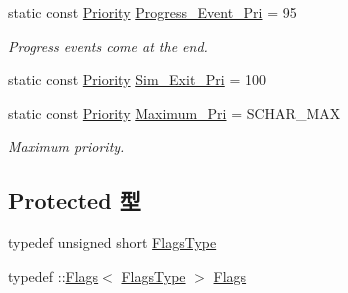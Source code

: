 \begin{DoxyCompactItemize}
\item 
static const \hyperlink{classEventBase_a6d92f7ee8144a5911ed46d85a89a4934}{Priority} \hyperlink{classEventBase_a9bf11ac679214b1615b6280f5e4d2bd9}{Progress\_\-Event\_\-Pri} = 95
\begin{DoxyCompactList}\small\item\em Progress events come at the end. \item\end{DoxyCompactList}\item 
static const \hyperlink{classEventBase_a6d92f7ee8144a5911ed46d85a89a4934}{Priority} \hyperlink{classEventBase_a0e91729fc98f99e73e3d13cb18cb123f}{Sim\_\-Exit\_\-Pri} = 100
\item 
static const \hyperlink{classEventBase_a6d92f7ee8144a5911ed46d85a89a4934}{Priority} \hyperlink{classEventBase_a3cc4c3d1f4018e493e84809438c598b4}{Maximum\_\-Pri} = SCHAR\_\-MAX
\begin{DoxyCompactList}\small\item\em Maximum priority. \item\end{DoxyCompactList}\end{DoxyCompactItemize}
\subsection*{Protected 型}
\begin{DoxyCompactItemize}
\item 
typedef unsigned short \hyperlink{classEventBase_ad01d22e048b90a29dcd44109f5fc4c5e}{FlagsType}
\item 
typedef ::\hyperlink{classFlags}{Flags}$<$ \hyperlink{classEventBase_ad01d22e048b90a29dcd44109f5fc4c5e}{FlagsType} $>$ \hyperlink{classEventBase_ad6cda6b0b8d7ddfbf8e769082577b482}{Flags}
\end{DoxyCompactItemize}
